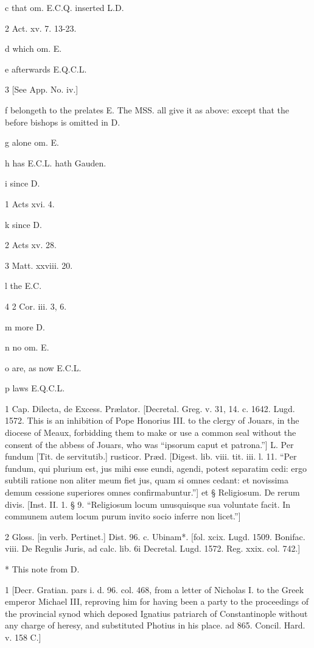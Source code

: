 c
that om. E.C.Q. inserted L.D.

2
Act. xv. 7. 13-23.

d
which om. E.

e
afterwards E.Q.C.L.

3
[See App. No. iv.]

f
belongeth to the prelates E. The MSS. all give it as above: except that the before bishops is omitted in D.

g
alone om. E.

h
has E.C.L. hath Gauden.

i
since D.

1
Acts xvi. 4.

k
since D.

2
Acts xv. 28.

3
Matt. xxviii. 20.

l
the E.C.

4
2 Cor. iii. 3, 6.

m
more D.

n
no om. E.

o
are, as now E.C.L.

p
laws E.Q.C.L.

1
Cap. Dilecta, de Excess. Prælator. [Decretal. Greg. v. 31, 14. c. 1642. Lugd. 1572. This is an inhibition of Pope Honorius III. to the clergy of Jouars, in the diocese of Meaux, forbidding them to make or use a common seal without the consent of the abbess of Jouars, who was “ipsorum caput et patrona.”] L. Per fundum [Tit. de servitutib.] rusticor. Præd. [Digest. lib. viii. tit. iii. l. 11. “Per fundum, qui plurium est, jus mihi esse eundi, agendi, potest separatim cedi: ergo subtili ratione non aliter meum fiet jus, quam si omnes cedant: et novissima demum cessione superiores omnes confirmabuntur.”] et § Religiosum. De rerum divis. [Inst. II. 1. § 9. “Religiosum locum unusquisque sua voluntate facit. In communem autem locum purum invito socio inferre non licet.”]

2
Gloss. [in verb. Pertinet.] Dist. 96. c. Ubinam*. [fol. xcix. Lugd. 1509. Bonifac. viii. De Regulis Juris, ad calc. lib. 6i Decretal. Lugd. 1572. Reg. xxix. col. 742.]

*
This note from D.

1
[Decr. Gratian. pars i. d. 96. col. 468, from a letter of Nicholas I. to the Greek emperor Michael III, reproving him for having been a party to the proceedings of the provincial synod which deposed Ignatius patriarch of Constantinople without any charge of heresy, and substituted Photius in his place. ad 865. Concil. Hard. v. 158 C.]

